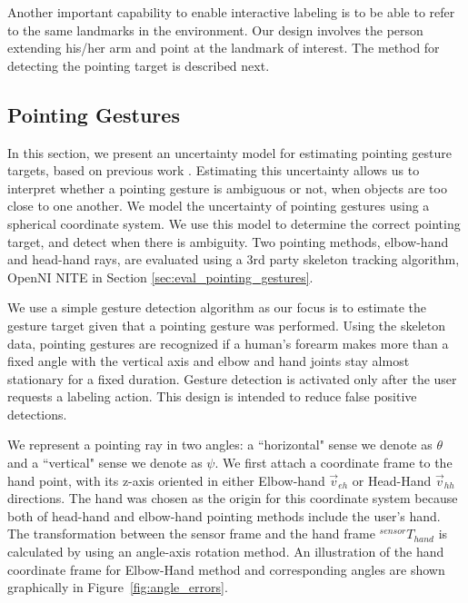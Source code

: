 \documentclass{tADR2e}
\begin{document}
Another important capability to enable interactive labeling is to be able to refer to the same landmarks in the environment. Our design involves the person extending his/her arm and point at the landmark of interest. The method for detecting the pointing target is described next.


\subsection{Pointing Gestures}
\label{sec:pointing_gestures}

In this section, we present an uncertainty model for estimating pointing gesture targets, based on previous work \cite{cosgun2015did}. Estimating this uncertainty allows us to interpret whether a pointing gesture is ambiguous or not, when objects are too close to one another. We model the uncertainty of pointing gestures using a spherical coordinate system. We use this model to determine the correct pointing target, and detect when there is ambiguity. Two pointing methods, elbow-hand and head-hand rays, are evaluated using a 3rd party skeleton tracking algorithm, OpenNI NITE in Section \ref{sec:eval_pointing_gestures}.

We use a simple gesture detection algorithm as our focus is to estimate the gesture target given that a pointing gesture was performed. Using the skeleton data, pointing gestures are recognized if a human's forearm makes more than a fixed angle with the vertical axis and elbow and hand joints stay almost stationary for a fixed duration. Gesture detection is activated only after the user requests a labeling action. This design is intended to reduce false positive detections.

We represent a pointing ray in two angles: a ``horizontal" sense we denote as $\theta$ and a ``vertical" sense we denote as $\psi$. We first attach a coordinate frame to the hand point, with its z-axis oriented in either Elbow-hand $\vec{v}_{eh}$ or Head-Hand $\vec{v}_{hh}$ directions. The hand was chosen as the origin for this coordinate system because both of head-hand and elbow-hand pointing methods include the user's hand. The transformation between the sensor frame and the hand frame $^{sensor}T_{hand}$ is calculated by using an angle-axis rotation method. An illustration of the hand coordinate frame for Elbow-Hand method and corresponding angles are shown graphically in Figure~\ref{fig:angle_errors}.
\end{document}
